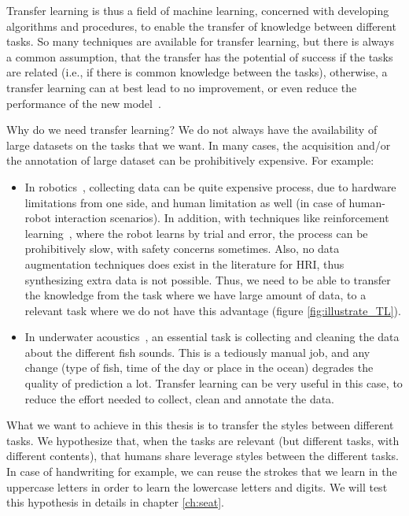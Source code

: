 \par Transfer learning is thus a field of machine learning, concerned with developing algorithms and procedures, to enable the transfer of knowledge between different tasks. So many techniques are available for transfer learning, but there is always a common assumption, that the transfer has the potential of success if the tasks are related (i.e., if there is common knowledge between the tasks), otherwise, a transfer learning can at best lead to no improvement, or even reduce the performance of the new model~\citep{weiss2016survey}.

\par Why do we need transfer learning? We do not always have the availability of large datasets on the tasks that we want. In many cases, the acquisition and/or the annotation of large dataset can be prohibitively expensive. For example:
\begin{itemize}
  \item In robotics~\citep{konidaris2012robot,Konidaris:2012:TRL:2188385.2343689}, collecting data can be quite expensive process, due to hardware limitations from one side, and human limitation as well (in case of human-robot interaction scenarios). In addition, with techniques like reinforcement learning~\citep{sutton2018reinforcement}, where the robot learns by trial and error, the process can be prohibitively slow, with safety concerns sometimes. Also, no data augmentation techniques does exist in the literature for HRI, thus synthesizing extra data is not possible. Thus, we need to be able to transfer the knowledge from the task where we have large amount of data, to a relevant task where we do not have this advantage (figure \ref{fig:illustrate_TL}).
  \item In underwater acoustics~\citep{malfante2018automatic}, an essential task is collecting and cleaning the data about the different fish sounds. This is a tediously manual job, and any change (type of fish, time of the day or place in the ocean) degrades the quality of prediction a lot. Transfer learning can be very useful in this case, to reduce the effort needed to collect, clean and annotate the data.
\end{itemize}

\par What we want to achieve in this thesis is to transfer the styles between different tasks. We hypothesize that, when the tasks are relevant (but different tasks, with different contents), that humans share leverage styles between the different tasks. In case of handwriting for example, we can reuse the strokes that we learn in the uppercase letters in order to learn the lowercase letters and digits. We will test this hypothesis in details in chapter \ref{ch:seat}.

